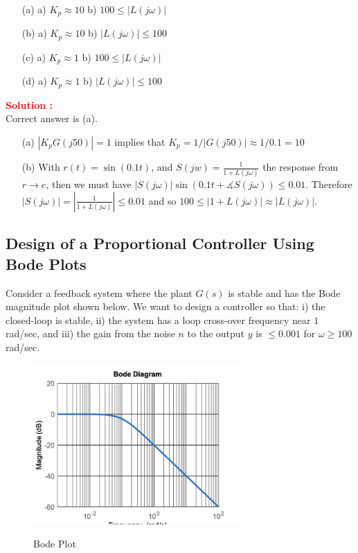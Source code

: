 \documentclass[12pt]{article}
\begin{document}
\begin{itemize}
    \item[(a)] a) $K_p \approx 10$ b) $100\leq  | L(j\omega)|$
    \item[(b)] a) $K_p \approx 10$ b) $| L(j\omega)| \leq 100$
    \item[(c)] a) $K_p \approx 1$ b) $100 \leq  | L(j\omega)|$
    \item[(d)] a) $K_p \approx 1$ b) $| L(j\omega)| \leq 100$
\end{itemize}
\textbf{\textcolor{red}{Solution :}}\\
Correct answer is (a).\\
\begin{itemize}
    \item[(a)] $|K_p G(j 50)| = 1$ implies that $K_p = 1/ |G(j 50)| \approx 1/ 0.1 = 10$
    \item[(b)] With $r(t)=\sin(0.1 t)$, and $S(j w) = \frac{1}{1+L(j \omega)}$ the response from $r \rightarrow e$, then we must have $|S(j \omega) |\sin(0.1 t + \measuredangle S(j \omega)) \leq 0.01$. Therefore $|S(j \omega)| = |\frac{1}{1 + L(j \omega)}| \leq 0.01$ and so $100\leq |1+L(j\omega)| \approx | L(j\omega)|$. 
\end{itemize}
\clearpage

\subsection{Design of a Proportional Controller Using Bode Plots}

Consider a feedback system where the plant $G(s)$ is stable and has the Bode magnitude plot shown below. We want to design a controller so that: i) the closed-loop is stable, ii) the system has a loop cross-over frequency near $1$ rad/sec, and iii) the gain from the noise $n$ to the output $y$ is $\leq 0.001$ for $\omega \geq 100$ rad/sec. 

\begin{figure}[h]
    \centering
    \includegraphics[width=0.7\textwidth]{figs/6.9.png}
    \label{fig:bode_94}
    \caption{Bode Plot}
\end{figure}
\end{document}
